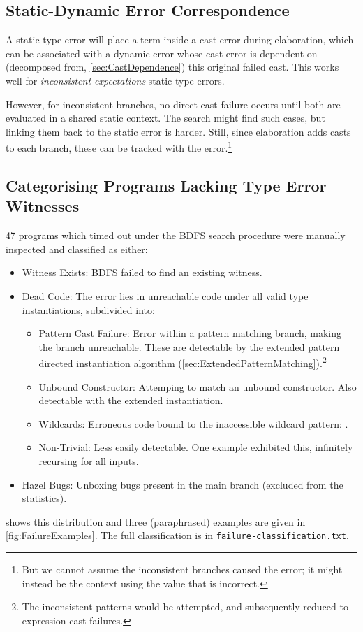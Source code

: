 \subsection{Static-Dynamic Error Correspondence}
\label{sec:ErrorCorrespondence}

A static type error will place a term inside a cast error during elaboration, which can be associated with a dynamic error whose cast error is dependent on (decomposed from, \cref{sec:CastDependence}) this original failed cast. This works well for \textit{inconsistent expectations} static type errors.

However, for inconsistent branches, no direct cast failure occurs until both are evaluated in a shared static context. The search might find such cases, but linking them back to the static error is harder. Still, since elaboration adds casts to each branch, these can be tracked with the error.\footnote{But we cannot assume the inconsistent branches caused the error; it might instead be the context using the value that is incorrect.}
  
\subsection{Categorising Programs Lacking Type Error Witnesses}
47 programs which timed out under the BDFS search procedure were manually inspected and classified as either:
\begin{itemize}
\item Witness Exists: BDFS failed to find an existing witness.
\item Dead Code: The error lies in unreachable code under all valid type instantiations, subdivided into:
\begin{itemize}
\item Pattern Cast Failure: Error within a pattern matching branch, making the branch unreachable. These are detectable by the extended pattern directed instantiation algorithm (\cref{sec:ExtendedPatternMatching}).\footnote{The inconsistent patterns would be attempted, and subsequently reduced to expression cast failures.}
\item Unbound Constructor: Attemping to match an unbound constructor. Also detectable with the extended instantiation.
\item Wildcards: Erroneous code bound to the inaccessible wildcard pattern: .
\item Non-Trivial: Less easily detectable. One example exhibited this, infinitely recursing for all inputs.
\end{itemize}
\item Hazel Bugs: Unboxing bugs present in the main branch (excluded from the statistics).
\end{itemize}
 shows this distribution and three (paraphrased) examples are given in \cref{fig:FailureExamples}. The full classification is in \texttt{failure-classification.txt}.

